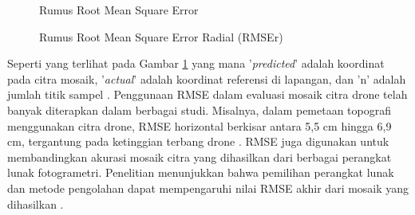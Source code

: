     \begin{figure}[H]
    \centering
    \caption{Rumus Root Mean Square Error \citep{geeksforgeeksRMSE}}
    \label{rumus_rmse}
    \end{figure}

    \begin{figure}[H]
    \centering
    \caption{Rumus Root Mean Square Error Radial (RMSEr)}
    \label{rumus_rmser}
    \end{figure}
    
    Seperti yang terlihat pada Gambar \ref{rumus_rmse} yang mana '\textit{predicted}' adalah koordinat pada citra mosaik, '\textit{actual}' adalah koordinat referensi di lapangan, dan 'n' adalah jumlah titik sampel \citep{jaud2016assessing}. Penggunaan RMSE dalam evaluasi mosaik citra drone telah banyak diterapkan dalam berbagai studi. Misalnya, dalam pemetaan topografi menggunakan citra drone, RMSE horizontal berkisar antara 5,5 cm hingga 6,9 cm, tergantung pada ketinggian terbang drone \citep{aguera2017assessment}. RMSE juga digunakan untuk membandingkan akurasi mosaik citra yang dihasilkan dari berbagai perangkat lunak fotogrametri. Penelitian menunjukkan bahwa pemilihan perangkat lunak dan metode pengolahan dapat mempengaruhi nilai RMSE akhir dari mosaik yang dihasilkan \citep{padro2019comparison}. 
    



